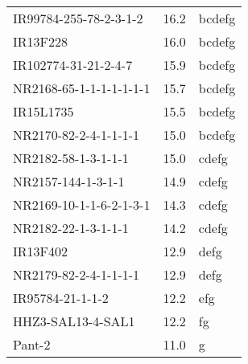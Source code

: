 \documentclass[]{article}
\begin{document}
\begin{longtable}{lll}
\rowcolor{gray!6}  IR99784-255-78-2-3-1-2 & 16.2 & bcdefg\\
IR13F228 & 16.0 & bcdefg\\
\addlinespace
\rowcolor{gray!6}  IR102774-31-21-2-4-7 & 15.9 & bcdefg\\
NR2168-65-1-1-1-1-1-1-1 & 15.7 & bcdefg\\
\rowcolor{gray!6}  IR15L1735 & 15.5 & bcdefg\\
NR2170-82-2-4-1-1-1-1 & 15.0 & bcdefg\\
\rowcolor{gray!6}  NR2182-58-1-3-1-1-1 & 15.0 & cdefg\\
\addlinespace
NR2157-144-1-3-1-1 & 14.9 & cdefg\\
\rowcolor{gray!6}  NR2169-10-1-1-6-2-1-3-1 & 14.3 & cdefg\\
NR2182-22-1-3-1-1-1 & 14.2 & cdefg\\
\rowcolor{gray!6}  IR13F402 & 12.9 & defg\\
NR2179-82-2-4-1-1-1-1 & 12.9 & defg\\
\addlinespace
\rowcolor{gray!6}  IR95784-21-1-1-2 & 12.2 & efg\\
HHZ3-SAL13-4-SAL1 & 12.2 & fg\\
\rowcolor{gray!6}  Pant-2 & 11.0 & g\\
\bottomrule
\end{longtable}
\endgroup{}
\begingroup\fontsize{12}{14}\selectfont
\end{document}
